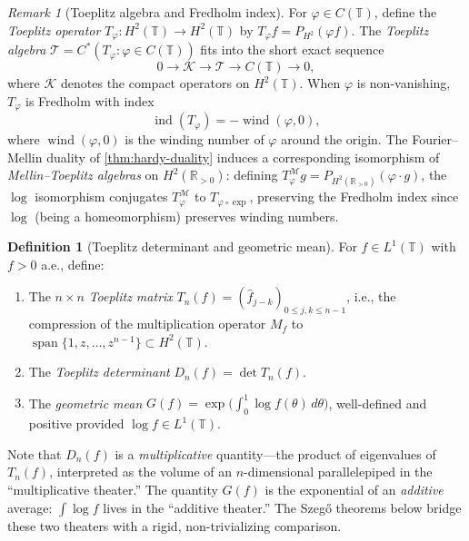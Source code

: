 \documentclass[12pt]{amsart}
\theoremstyle{definition}
\newtheorem{definition}[theorem]{Definition}
\theoremstyle{remark}
\newtheorem*{remark}{Remark}
\newcommand{\Rpos}{\mathbb{R}_{>0}}
\newcommand{\bT}{\mathbb{T}}
\newcommand{\cM}{\mathcal{M}}
\newcommand{\Htwo}{H^2}
\newcommand{\cK}{\mathcal{K}}
\newcommand{\cT}{\mathcal{T}}
\DeclareMathOperator{\ind}{ind}
\begin{document}
\begin{remark}[Toeplitz algebra and Fredholm index]
For $\varphi \in C(\bT)$, define the \emph{Toeplitz operator} $T_\varphi : \Htwo(\bT) \to \Htwo(\bT)$ by $T_\varphi f = P_{\Htwo}(\varphi f)$. The \emph{Toeplitz algebra} $\cT = C^*(T_\varphi : \varphi \in C(\bT))$ fits into the short exact sequence \cite[Chapter~7]{Douglas}
\[
0 \to \cK \to \cT \to C(\bT) \to 0,
\]
where $\cK$ denotes the compact operators on $\Htwo(\bT)$. When $\varphi$ is non-vanishing, $T_\varphi$ is Fredholm with index \cite[Chapter~7]{Nikolski}
\[
\ind(T_\varphi) = -\operatorname{wind}(\varphi, 0),
\]
where $\operatorname{wind}(\varphi, 0)$ is the winding number of $\varphi$ around the origin. The Fourier--Mellin duality of \cref{thm:hardy-duality} induces a corresponding isomorphism of \emph{Mellin--Toeplitz algebras} on $\Htwo(\Rpos)$: defining $T_\varphi^{\cM} g = P_{\Htwo(\Rpos)}(\varphi \cdot g)$, the $\log$ isomorphism conjugates $T_\varphi^{\cM}$ to $T_{\varphi \circ \exp}$, preserving the Fredholm index since $\log$ (being a homeomorphism) preserves winding numbers.
\end{remark}

\begin{definition}[Toeplitz determinant and geometric mean]\label{def:toeplitz-det}
For $f \in L^1(\bT)$ with $f > 0$ a.e., define:
\begin{enumerate}[label=(\alph*)]
\item The $n \times n$ \emph{Toeplitz matrix} $T_n(f) = (\widehat{f}_{j-k})_{0 \leq j,k \leq n-1}$, i.e., the compression of the multiplication operator $M_f$ to $\operatorname{span}\{1, z, \ldots, z^{n-1}\} \subset \Htwo(\bT)$.
\item The \emph{Toeplitz determinant} $D_n(f) = \det T_n(f)$.
\item The \emph{geometric mean} $G(f) = \exp\bigl(\int_0^1 \log f(\theta)\, d\theta\bigr)$, well-defined and positive provided $\log f \in L^1(\bT)$.
\end{enumerate}
Note that $D_n(f)$ is a \emph{multiplicative} quantity---the product of eigenvalues of $T_n(f)$, interpreted as the volume of an $n$-dimensional parallelepiped in the ``multiplicative theater.'' The quantity $G(f)$ is the exponential of an \emph{additive} average: $\int \log f$ lives in the ``additive theater.'' The Szeg\H{o} theorems below bridge these two theaters with a rigid, non-trivializing comparison.
\end{definition}
\end{document}
